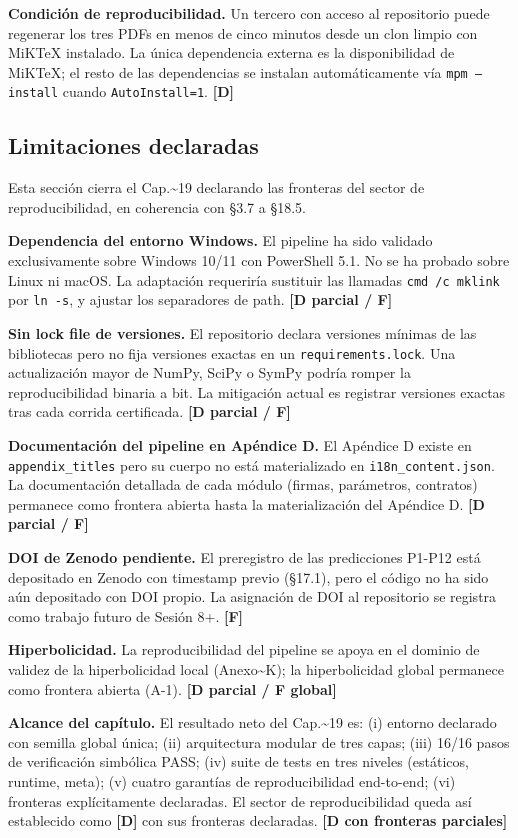 ﻿\documentclass[11pt,letterpaper]{article}
\begin{document}
\textbf{Condición de reproducibilidad.} Un tercero con acceso al repositorio puede regenerar los tres PDFs en menos de cinco minutos desde un clon limpio con MiKTeX instalado. La única dependencia externa es la disponibilidad de MiKTeX; el resto de las dependencias se instalan automáticamente vía \texttt{mpm --install} cuando \texttt{AutoInstall=1}. \textbf{[D]}
\subsection{Limitaciones declaradas}
Esta sección cierra el Cap.\textasciitilde{}19 declarando las fronteras del sector de reproducibilidad, en coherencia con §3.7 a §18.5.

\textbf{Dependencia del entorno Windows.} El pipeline ha sido validado exclusivamente sobre Windows 10/11 con PowerShell 5.1. No se ha probado sobre Linux ni macOS. La adaptación requeriría sustituir las llamadas \texttt{cmd /c mklink} por \texttt{ln -s}, y ajustar los separadores de path. \textbf{[D parcial / F]}

\textbf{Sin lock file de versiones.} El repositorio declara versiones mínimas de las bibliotecas pero no fija versiones exactas en un \texttt{requirements.lock}. Una actualización mayor de NumPy, SciPy o SymPy podría romper la reproducibilidad binaria a bit. La mitigación actual es registrar versiones exactas tras cada corrida certificada. \textbf{[D parcial / F]}

\textbf{Documentación del pipeline en Apéndice D.} El Apéndice D existe en \texttt{appendix\_titles} pero su cuerpo no está materializado en \texttt{i18n\_content.json}. La documentación detallada de cada módulo (firmas, parámetros, contratos) permanece como frontera abierta hasta la materialización del Apéndice D. \textbf{[D parcial / F]}

\textbf{DOI de Zenodo pendiente.} El preregistro de las predicciones P1-P12 está depositado en Zenodo con timestamp previo (§17.1), pero el código no ha sido aún depositado con DOI propio. La asignación de DOI al repositorio se registra como trabajo futuro de Sesión 8+. \textbf{[F]}

\textbf{Hiperbolicidad.} La reproducibilidad del pipeline se apoya en el dominio de validez de la hiperbolicidad local (Anexo\textasciitilde{}K); la hiperbolicidad global permanece como frontera abierta (A-1). \textbf{[D parcial / F global]}

\textbf{Alcance del capítulo.} El resultado neto del Cap.\textasciitilde{}19 es: (i) entorno declarado con semilla global única; (ii) arquitectura modular de tres capas; (iii) 16/16 pasos de verificación simbólica PASS; (iv) suite de tests en tres niveles (estáticos, runtime, meta); (v) cuatro garantías de reproducibilidad end-to-end; (vi) fronteras explícitamente declaradas. El sector de reproducibilidad queda así establecido como \textbf{[D]} con sus fronteras declaradas. \textbf{[D con fronteras parciales]}
\end{document}
